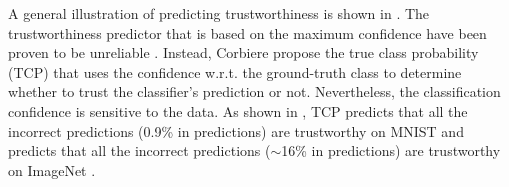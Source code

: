 

A general illustration of predicting trustworthiness \cite{Corbiere_NIPS_2019,Hendrycks_ICLR_2017} is shown in .
The trustworthiness predictor \cite{Hendrycks_ICLR_2017} that is based on the maximum confidence have been proven to be unreliable \cite{Jiang_NIPS_2018,Provost_ICML_1998,Goodfellow_ICLR_2015,Nguyen_CVPR_2015}.
Instead, Corbiere \etal \cite{Corbiere_NIPS_2019} propose the true class probability (TCP) that uses the confidence w.r.t. the ground-truth class to determine whether to trust the classifier's prediction or not.
Nevertheless, the classification confidence is sensitive to the data.
As shown in , TCP predicts that all the incorrect predictions (0.9\% in predictions) are trustworthy on MNIST \cite{Lecun_IEEE_1998} and predicts that all the incorrect predictions ($\sim$16\% in predictions) are trustworthy on ImageNet \cite{Deng_CVPR_2009}.

